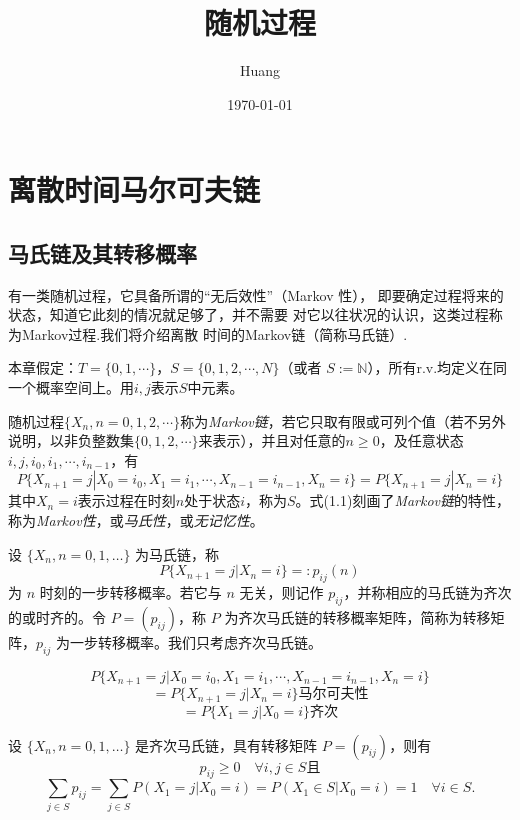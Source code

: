 \documentclass[lang=cn,10pt,thmcnt=section]{elegantbook}
\title{随机过程}
\author{Huang}
\date{\today}
\begin{document}
	
	\maketitle
	\frontmatter
	
	\tableofcontents
	
	\mainmatter
	\chapter{离散时间马尔可夫链}
	\section{马氏链及其转移概率}
	有一类随机过程，它具备所谓的“无后效性”（Markov 性），
即要确定过程将来的状态，知道它此刻的情况就足够了，并不需要
对它以往状况的认识，这类过程称为Markov过程.我们将介绍离散
时间的Markov链（简称马氏链）.

本章假定：$T = \{0, 1, \cdots\}$，$S = \{0, 1, 2, \cdots, N\}$（或者 $S := \mathbb{N}$），所有r.v.均定义在同一个概率空间上。用$i, j$表示$S$中元素。
\begin{definition}[离散时间马尔可夫链]
	随机过程$\{X_n, n = 0, 1, 2, \cdots\}$称为\textit{Markov链}，若它只取有限或可列个值（若不另外说明，以非负整数集$\{0, 1, 2, \cdots\}$来表示），并且对任意的$n \geq 0$，及任意状态$i, j, i_0, i_1, \cdots, i_{n-1}$，有
\begin{equation}
P\{X_{n+1} = j | X_0 = i_0, X_1 = i_1, \cdots, X_{n-1} = i_{n-1}, X_n = i\} = P\{X_{n+1} = j | X_n = i\}
\end{equation}
其中$X_n = i$表示过程在时刻$n$处于状态$i$，称为$S$。式(1.1)刻画了\textit{Markov链}的特性，称为\textit{Markov性}，或\textit{马氏性}，或\textit{无记忆性}。
\end{definition}

\begin{definition}[转移概率]
	设 $\{X_n, n = 0, 1, \ldots\}$ 为马氏链，称
\[ P\{X_{n+1} = j | X_n = i\} =: p_{ij}(n) \]
为 $n$ 时刻的一步转移概率。若它与 $n$ 无关，则记作 $p_{ij}$，并称相应的马氏链为齐次的或时齐的。令 $P = (p_{ij})$，称 $P$ 为齐次马氏链的转移概率矩阵，简称为转移矩阵，$p_{ij}$ 为一步转移概率。我们只考虑齐次马氏链。

\end{definition}

\[ P\{X_{n+1} = j | X_0 = i_0, X_1 = i_1, \cdots, X_{n-1} = i_{n-1}, X_n = i\} \]
\[ = P\{X_{n+1} = j | X_n = i\} \text{马尔可夫性} \]
\[ = P\{X_1 = j | X_0 = i\} \text{齐次} \]

设 $\{X_n, n = 0, 1, \ldots\}$ 是齐次马氏链，具有转移矩阵 $P = (p_{ij})$，则有
\[ p_{ij} \geq 0 \quad \forall i, j \in S \text{且} \]
\[ \sum_{j \in S} p_{ij} = \sum_{j \in S} P(X_1 = j | X_0 = i) = P(X_1 \in S | X_0 = i) = 1 \quad \forall i \in S. \]
\end{document}
